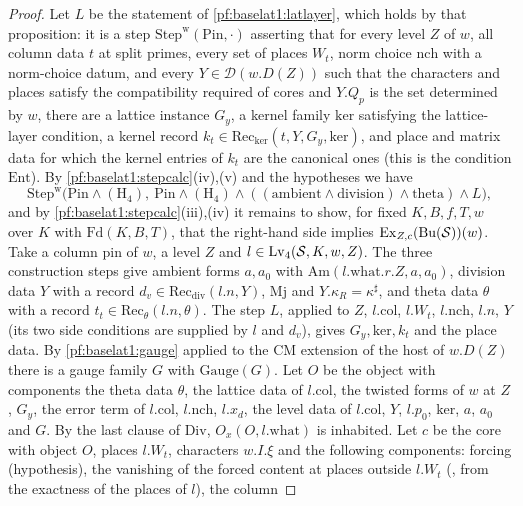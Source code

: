 \begin{proof}
Let $L$ be the statement of \cref{pf:baselat1:latlayer}, which holds by that proposition: it is a
step $\mathrm{Step}^{\mathrm w}(\mathrm{Pin},\cdot)$ asserting that for every level $Z$ of $w$, all column data
$t$ at split primes, every set of places $W_t$, norm choice $\mathrm{nch}$ with a norm-choice datum, and
every $Y\in\mathcal{D}(w.D(Z))$ such that the characters and places satisfy the compatibility required of cores
and $Y.Q_p$ is the set determined by $w$, there are a lattice instance $G_y$, a kernel family $\mathrm{ker}$
satisfying the lattice-layer condition, a kernel record $k_t\in\mathrm{Rec}_{\ker}(t,Y,G_y,\mathrm{ker})$, and
place and matrix data for which the kernel entries of $k_t$ are the canonical ones
(this is the condition $\mathrm{Ent}$). By \cref{pf:baselat1:stepcalc}(iv),(v) and the hypotheses we have
\[
\mathrm{Step}^{\mathrm w}\bigl(\mathrm{Pin}\wedge(\mathrm{H}_4),\ \mathrm{Pin}\wedge(\mathrm{H}_4)\wedge
((\text{ambient}\wedge\text{division})\wedge\text{theta})\wedge L\bigr),
\]
and by \cref{pf:baselat1:stepcalc}(iii),(iv) it remains to show, for fixed $K,B,f,T,w$ over $K$ with
$\mathrm{Fd}(K,B,T)$, that the right-hand side implies $\mathrm{Ex}_{Z,c}(\mathrm{Bu}(\mathcal S))(w)$.
Take a column pin of $w$, a level $Z$ and $l\in\mathrm{Lv}_4(\mathcal S,K,w,Z)$. The three construction
steps give ambient forms $a,a_0$ with $\mathrm{Am}(l.\mathrm{what}.r.Z,a,a_0)$, division data $Y$ with a
record $d_v\in\mathrm{Rec}_{\mathrm{div}}(l.n,Y)$, $\mathrm{Mj}$ and $Y.\kappa_R=\kappa^\sharp$, and theta data
$\theta$ with a record $t_t\in\mathrm{Rec}_{\theta}(l.n,\theta)$. The step $L$, applied to $Z$, $l.\mathrm{col}$,
$l.W_t$, $l.\mathrm{nch}$, $l.n$, $Y$ (its two side conditions are supplied by $l$ and $d_v$), gives
$G_y,\mathrm{ker},k_t$ and the place data. By \cref{pf:baselat1:gauge} applied to the CM extension of the host of
$w.D(Z)$ there is a gauge family $G$ with $\mathrm{Gauge}(G)$. Let $O$ be the object with components
the theta data $\theta$, the lattice data of $l.\mathrm{col}$, the twisted forms of $w$ at $Z$, $G_y$, the
error term of $l.\mathrm{col}$, $l.\mathrm{nch}$, $l.x_d$, the level data of $l.\mathrm{col}$, $Y$, $l.p_0$,
$\mathrm{ker}$, $a$, $a_0$ and $G$. By the last clause of $\mathrm{Div}$, $O_x(O,l.\mathrm{what})$ is
inhabited. Let $c$ be the core with object $O$, places $l.W_t$, characters $w.I.\xi$ and the following
components: forcing (hypothesis), the vanishing of the forced content at places outside $l.W_t$
(, from the exactness of the places of $l$), the column

\end{proof}
